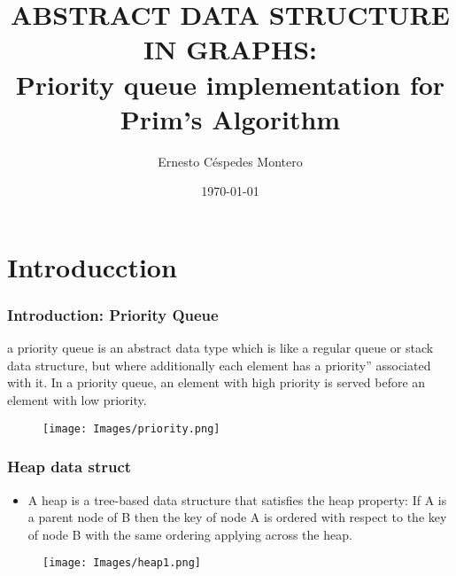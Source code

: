\documentclass{beamer}
\title[GraphLib]{{\tiny ABSTRACT DATA STRUCTURE IN GRAPHS:}\\ Priority queue implementation for Prim's Algorithm} %
\author{Ernesto Céspedes Montero} %
\institute[UCR] %
{
Universdad de Costa Rica \\ %
\medskip
\textit{netosoy@gmail.com} %
}
\date{\today} %
\begin{document}
\begin{frame}
\titlepage %
\end{frame}



\section{Introducction} %

\begin{frame}
\frametitle{Introduction: Priority Queue}

a priority queue is an abstract data type which is like a regular queue or stack data structure, but where additionally each element has a priority''  associated with it. In a priority queue, an element with high priority is served before an element with low priority.

\begin{figure}[h]
\texttt{[image: Images/priority.png]}
\centering
\end{figure}
\end{frame}

\begin{frame}
\frametitle{Heap data struct}
\begin{itemize}
\item A heap is a tree-based data structure that satisfies the heap property: If A is a parent node of B then the key of node A is ordered with respect to the key of node B with the same ordering applying across the heap.
\end{itemize}
\begin{figure}[h]
\texttt{[image: Images/heap1.png]}
\centering
\end{figure}
\end{frame}
\end{document}
